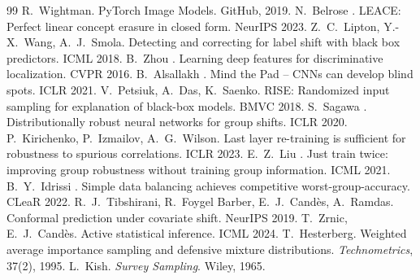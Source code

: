 \documentclass[10pt,twocolumn,letterpaper]{article}
\begin{document}
{\begin{thebibliography}{99}
 R.~Wightman. PyTorch Image Models. GitHub, 2019.
 N.~Belrose \etal. LEACE: Perfect linear concept erasure in closed form. NeurIPS 2023.
 Z.~C.~Lipton, Y.-X.~Wang, A.~J.~Smola. Detecting and correcting for label shift with black box predictors. ICML 2018.
 B.~Zhou \etal. Learning deep features for discriminative localization. CVPR 2016.
 B.~Alsallakh \etal. Mind the Pad -- CNNs can develop blind spots. ICLR 2021.
 V.~Petsiuk, A.~Das, K.~Saenko. RISE: Randomized input sampling for explanation of black-box models. BMVC 2018.
 S.~Sagawa \etal. Distributionally robust neural networks for group shifts. ICLR 2020.
 P.~Kirichenko, P.~Izmailov, A.~G.~Wilson. Last layer re-training is sufficient for robustness to spurious correlations. ICLR 2023.
 E.~Z.~Liu \etal. Just train twice: improving group robustness without training group information. ICML 2021.
 B.~Y.~Idrissi \etal. Simple data balancing achieves competitive worst-group-accuracy. CLeaR 2022.
 R.~J.~Tibshirani, R.~Foygel Barber, E.~J.~Cand\`es, A.~Ramdas. Conformal prediction under covariate shift. NeurIPS 2019.
 T.~Zrnic, E.~J.~Cand\`es. Active statistical inference. ICML 2024.
 T.~Hesterberg. Weighted average importance sampling and defensive mixture distributions. \emph{Technometrics}, 37(2), 1995.
 L.~Kish. \emph{Survey Sampling}. Wiley, 1965.
\end{thebibliography}}
\end{document}
